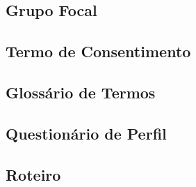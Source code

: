 \begin{apendicesenv}

\partapendices



\chapter{Grupo Focal} \label{ap:GRUPOFOCAL}

\section{Termo de Consentimento}
    \begin{figure}
        \centering
         
    \end{figure}
\newpage
\section{Glossário de Termos}
    \begin{figure}
        \centering
         
    \end{figure}
\newpage
\section{Questionário de Perfil}
    \begin{figure}
        \centering
         
    \end{figure}
\newpage
\section{Roteiro}
    \begin{figure}
        \centering
         
    \end{figure}
\newpage

\end{apendicesenv}
